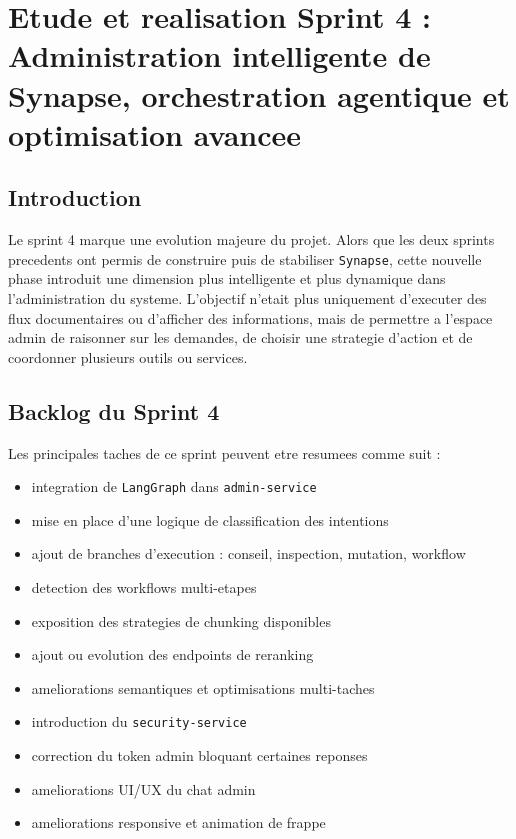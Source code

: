 \chapter{Etude et realisation Sprint 4 : Administration intelligente de Synapse, orchestration agentique et optimisation avancee}

\section{Introduction}

Le sprint 4 marque une evolution majeure du projet. Alors que les deux sprints precedents ont permis de construire puis de stabiliser \texttt{Synapse}, cette nouvelle phase introduit une dimension plus intelligente et plus dynamique dans l'administration du systeme. L'objectif n'etait plus uniquement d'executer des flux documentaires ou d'afficher des informations, mais de permettre a l'espace admin de raisonner sur les demandes, de choisir une strategie d'action et de coordonner plusieurs outils ou services.

\section{Backlog du Sprint 4}

Les principales taches de ce sprint peuvent etre resumees comme suit :

\begin{itemize}
\item integration de \texttt{LangGraph} dans \texttt{admin-service}
\item mise en place d'une logique de classification des intentions
\item ajout de branches d'execution : conseil, inspection, mutation, workflow
\item detection des workflows multi-etapes
\item exposition des strategies de chunking disponibles
\item ajout ou evolution des endpoints de reranking
\item ameliorations semantiques et optimisations multi-taches
\item introduction du \texttt{security-service}
\item correction du token admin bloquant certaines reponses
\item ameliorations UI/UX du chat admin
\item ameliorations responsive et animation de frappe
\end{itemize}

